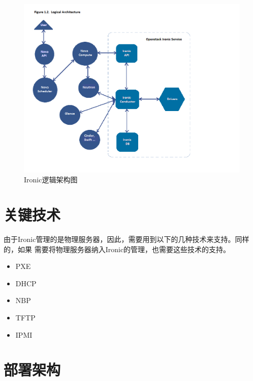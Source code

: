 \begin{figure}[H]
  \centering
  \includegraphics[width=\linewidth]{logical_architecture.png}
  \caption{Ironic逻辑架构图\protect\footnotemark}
  \label{fig:logical_architecture}
\end{figure}

\section{关键技术}
由于Ironic管理的是物理服务器，因此，需要用到以下的几种技术来支持。同样的，如果
需要将物理服务器纳入Ironic的管理，也需要这些技术的支持。

\begin{itemize}
  \item PXE
  \item DHCP
  \item NBP
  \item TFTP
  \item IPMI
\end{itemize}

\section{部署架构}

